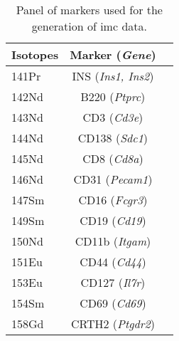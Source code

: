 \vspace{-30pt}
\begin{table}[ht!]
  \renewcommand{\arraystretch}{0.9} %
  \centering
   \caption[Panel of markers used for the generation of  data]{Panel of markers used for the generation of \gls{imc} data.}
  \label{tab:app_imc_panel}
  \begin{tabularx}{\textwidth}{xCC}
    \toprule
        \textbf{Isotopes} & \textbf{Marker (\textit{Gene})} & 
     \\
    \midrule
    141Pr & INS (\textit{Ins1, Ins2}) &  \\
    \midrule
    142Nd & B220 (\textit{Ptprc}) &  \\
    \midrule
    143Nd & CD3 (\textit{Cd3e}) &  \\
    \midrule
    144Nd & CD138 (\textit{Sdc1}) &  \\
    \midrule
    145Nd & CD8 (\textit{Cd8a}) &  \\
    \midrule
    146Nd & CD31 (\textit{Pecam1}) &  \\
    \midrule
    147Sm & CD16 (\textit{Fcgr3}) &  \\
    \midrule
    149Sm & CD19 (\textit{Cd19}) &  \\
    \midrule
    150Nd & CD11b (\textit{Itgam}) &   \\
    \midrule
    151Eu & CD44 (\textit{Cd44}) &  \\
    \midrule
    153Eu & CD127 (\textit{Il7r}) &   \\
    \midrule
    154Sm & CD69 (\textit{Cd69}) &   \\
    \midrule
    158Gd & CRTH2 (\textit{Ptgdr2}) &  \\
    \midrule

\end{tabularx}
\end{table}
